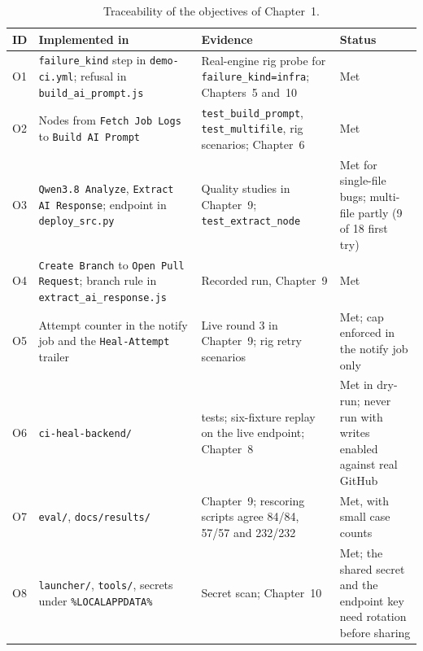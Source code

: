 \begin{table}[!htbp]
\centering
\small
\begin{tabularx}{\linewidth}{>{\raggedright\arraybackslash}p{1.0cm} >{\raggedright\arraybackslash}X >{\raggedright\arraybackslash}X >{\raggedright\arraybackslash}p{2.6cm}}
\toprule
\textbf{ID} & \textbf{Implemented in} & \textbf{Evidence} & \textbf{Status} \\
\midrule
O1 & \texttt{failure\_kind} step in \texttt{demo-ci.yml}; refusal in \texttt{build\_ai\_prompt.js} & Real-engine rig probe for \texttt{failure\_kind=infra}; Chapters~5 and~10 & Met \\
O2 & Nodes from \texttt{Fetch Job Logs} to \texttt{Build AI Prompt} & \texttt{test\_build\_prompt}, \texttt{test\_multifile}, rig scenarios; Chapter~6 & Met \\
O3 & \texttt{Qwen3.8 Analyze}, \texttt{Extract AI Response}; endpoint in \texttt{deploy\_src.py} & Quality studies in Chapter~9; \texttt{test\_extract\_node} & Met for single-file bugs; multi-file partly (9 of 18 first try) \\
O4 & \texttt{Create Branch} to \texttt{Open Pull Request}; branch rule in \texttt{extract\_ai\_response.js} & Recorded run, Chapter~9 & Met \\
O5 & Attempt counter in the notify job and the \texttt{Heal-Attempt} trailer & Live round 3 in Chapter~9; rig retry scenarios & Met; cap enforced in the notify job only \\
O6 & \texttt{ci-heal-backend/} & 205 tests; six-fixture replay on the live endpoint; Chapter~8 & Met in dry-run; never run with writes enabled against real GitHub \\
O7 & \texttt{eval/}, \texttt{docs/results/} & Chapter~9; rescoring scripts agree 84/84, 57/57 and 232/232 & Met, with small case counts \\
O8 & \texttt{launcher/}, \texttt{tools/}, secrets under \texttt{\%LOCALAPPDATA\%} & Secret scan; Chapter~10 & Met; the shared secret and the endpoint key need rotation before sharing \\
\bottomrule
\end{tabularx}
\caption{Traceability of the objectives of Chapter~1.}
\label{tab:traceability}
\end{table}


